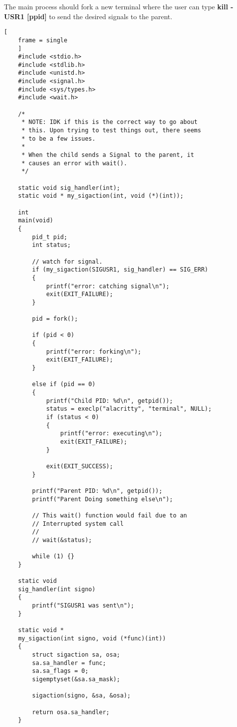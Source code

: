 \documentclass{article}
\begin{document}
The main process should fork a new terminal where the user can type \textbf{kill -USR1 [ppid]}
to send the desired signals to the parent.
\begin{lstlisting}[
    frame = single
    ]
    #include <stdio.h>
    #include <stdlib.h>
    #include <unistd.h>
    #include <signal.h>
    #include <sys/types.h>
    #include <wait.h>

    /*
     * NOTE: IDK if this is the correct way to go about
     * this. Upon trying to test things out, there seems
     * to be a few issues.
     *
     * When the child sends a Signal to the parent, it 
     * causes an error with wait().
     */

    static void sig_handler(int);
    static void * my_sigaction(int, void (*)(int));

    int
    main(void)
    {
        pid_t pid;
        int status;

        // watch for signal.
        if (my_sigaction(SIGUSR1, sig_handler) == SIG_ERR)
        {
            printf("error: catching signal\n");
            exit(EXIT_FAILURE);
        }

        pid = fork();

        if (pid < 0)
        {
            printf("error: forking\n");
            exit(EXIT_FAILURE); 
        } 

        else if (pid == 0) 
        { 
            printf("Child PID: %d\n", getpid());
            status = execlp("alacritty", "terminal", NULL); 
            if (status < 0) 
            { 
                printf("error: executing\n"); 
                exit(EXIT_FAILURE); 
            } 

            exit(EXIT_SUCCESS);
        } 

        printf("Parent PID: %d\n", getpid());
        printf("Parent Doing something else\n");

        // This wait() function would fail due to an 
        // Interrupted system call
        //
        // wait(&status);

        while (1) {}
    }

    static void 
    sig_handler(int signo)
    {
        printf("SIGUSR1 was sent\n");
    }

    static void * 
    my_sigaction(int signo, void (*func)(int))
    {
        struct sigaction sa, osa;
        sa.sa_handler = func;
        sa.sa_flags = 0;
        sigemptyset(&sa.sa_mask);

        sigaction(signo, &sa, &osa);

        return osa.sa_handler;
    }

\end{lstlisting}
\end{document}
